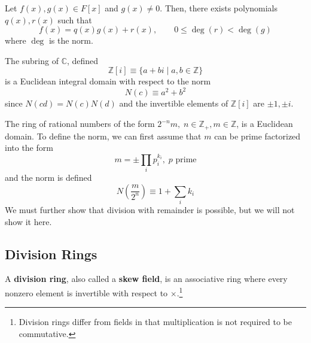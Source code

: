   \begin{theorem}
    Let $f(x), g(x) \in F[x]$ and $g(x) \neq 0$. Then, there exists polynomials $q(x), r(x)$ such that 
    \begin{equation}
      f(x) = q(x) g(x) + r(x), \qquad 0 \leq \deg(r) < \deg(g)
    \end{equation}
    where $\deg$ is the norm.
  \end{theorem}

  \begin{example}
    The subring of $\mathbb{C}$, defined
    \begin{equation}
      \mathbb{Z}[i] \equiv \{ a + b i \mid a, b \in \mathbb{Z} \}
    \end{equation}
    is a Euclidean integral domain with respect to the norm 
    \begin{equation}
      N(c) \equiv a^2 + b^2
    \end{equation}
    since $N(c d) = N(c) N(d)$ and the invertible elements of $\mathbb{Z}[i]$ are $\pm 1, \pm i$. 
  \end{example}

  \begin{example}
    The ring of rational numbers of the form $2^{-n} m, \; n \in \mathbb{Z}_+, m \in \mathbb{Z}$, is a Euclidean domain. To define the norm, we can first assume that $m$ can be prime factorized into the form 
    \begin{equation}
      m = \pm \prod_{i} p_{i}^{k_i}, \; p \text{ prime}
    \end{equation}
    and the norm is defined 
    \begin{equation}
      N(\frac{m}{2^n}) \equiv 1 + \sum_i k_i
    \end{equation}
    We must further show that division with remainder is possible, but we will not show it here. 
  \end{example}

  \begin{theorem}
    
  \end{theorem}

\subsection{Division Rings}

  \begin{definition}
    A \textbf{division ring}, also called a \textbf{skew field}, is an associative ring where every nonzero element is invertible with respect to $\times$.\footnote{Division rings differ from fields in that multiplication is not required to be commutative. }
  \end{definition}

